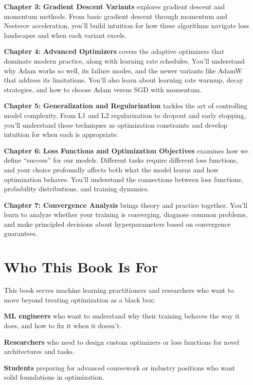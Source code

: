 \documentclass[../main.tex]{subfiles}
\begin{document}
\textbf{Chapter 3: Gradient Descent Variants} explores gradient descent and momentum methods. From basic gradient descent through momentum and Nesterov acceleration, you'll build intuition for how these algorithms navigate loss landscapes and when each variant excels.

\textbf{Chapter 4: Advanced Optimizers} covers the adaptive optimizers that dominate modern practice, along with learning rate schedules. You'll understand why Adam works so well, its failure modes, and the newer variants like AdamW that address its limitations. You'll also learn about learning rate warmup, decay strategies, and how to choose Adam versus SGD with momentum.

\textbf{Chapter 5: Generalization and Regularization} tackles the art of controlling model complexity. From L1 and L2 regularization to dropout and early stopping, you'll understand these techniques as optimization constraints and develop intuition for when each is appropriate.

\textbf{Chapter 6: Loss Functions and Optimization Objectives} examines how we define ``success'' for our models. Different tasks require different loss functions, and your choice profoundly affects both what the model learns and how optimization behaves. You'll understand the connections between loss functions, probability distributions, and training dynamics.

\textbf{Chapter 7: Convergence Analysis} brings theory and practice together. You'll learn to analyze whether your training is converging, diagnose common problems, and make principled decisions about hyperparameters based on convergence guarantees.

\section*{Who This Book Is For}

This book serves machine learning practitioners and researchers who want to move beyond treating optimization as a black box:

\textbf{ML engineers} who want to understand why their training behaves the way it does, and how to fix it when it doesn't.

\textbf{Researchers} who need to design custom optimizers or loss functions for novel architectures and tasks.

\textbf{Students} preparing for advanced coursework or industry positions who want solid foundations in optimization.
\end{document}
